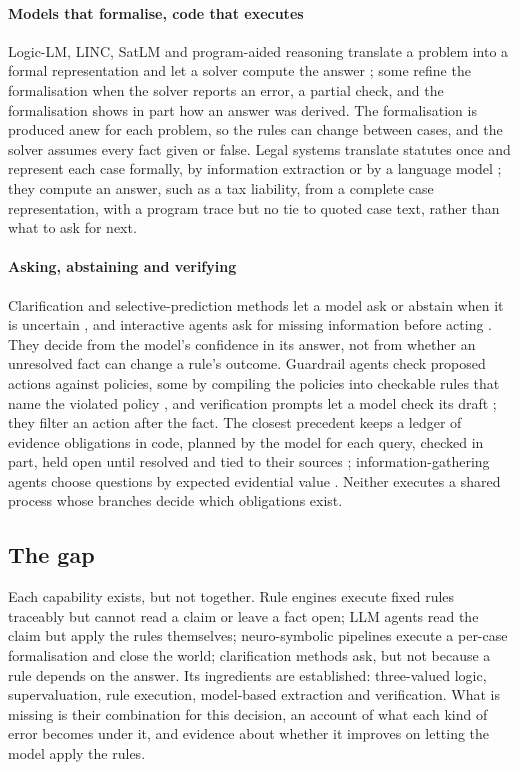 \paragraph{Models that formalise, code that executes}
Logic-LM, LINC, SatLM and program-aided reasoning translate a problem into a formal representation and let a solver compute the answer \cite{pan2023logic,olausson2023linc,ye2023satlm,gao2023pal}; some refine the formalisation when the solver reports an error, a partial check, and the formalisation shows in part how an answer was derived. The formalisation is produced anew for each problem, so the rules can change between cases, and the solver assumes every fact given or false. Legal systems translate statutes once and represent each case formally, by information extraction or by a language model \cite{holzenberger2023connecting,jurayj2026tax,kant2024equitable}; they compute an answer, such as a tax liability, from a complete case representation, with a program trace but no tie to quoted case text, rather than what to ask for next.

\paragraph{Asking, abstaining and verifying}
Clarification and selective-prediction methods let a model ask or abstain when it is uncertain \cite{rao2018learning,aliannejadi2019asking,kamath2020selective,wen2025abstention}, and interactive agents ask for missing information before acting \cite{li2024mediq,zhang2024askbeforeplan}. They decide from the model's confidence in its answer, not from whether an unresolved fact can change a rule's outcome. Guardrail agents check proposed actions against policies, some by compiling the policies into checkable rules that name the violated policy \cite{chen2025shieldagent,xiang2025guardagent}, and verification prompts let a model check its draft \cite{dhuliawala2024chain}; they filter an action after the fact. The closest precedent keeps a ledger of evidence obligations in code, planned by the model for each query, checked in part, held open until resolved and tied to their sources \cite{kim2026evidenceobligation}; information-gathering agents choose questions by expected evidential value \cite{taranukhin2026infogatherer}. Neither executes a shared process whose branches decide which obligations exist.

\subsection{The gap}
\label{sec:gap}

Each capability exists, but not together. Rule engines execute fixed rules traceably but cannot read a claim or leave a fact open; LLM agents read the claim but apply the rules themselves; neuro-symbolic pipelines execute a per-case formalisation and close the world; clarification methods ask, but not because a rule depends on the answer. Its ingredients are established: three-valued logic, supervaluation, rule execution, model-based extraction and verification. What is missing is their combination for this decision, an account of what each kind of error becomes under it, and evidence about whether it improves on letting the model apply the rules.
